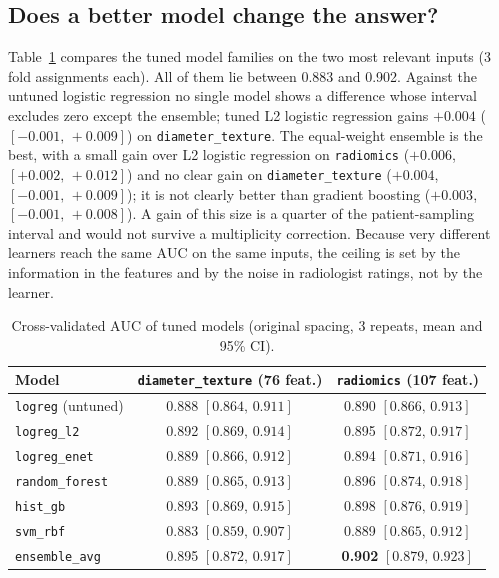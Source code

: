 \documentclass[journal]{IEEEtran}
\newcommand{\auc}{\mathrm{AUC}}
\newcommand{\ci}[2]{[#1,\,#2]}            %
\newcommand{\code}[1]{\texttt{#1}}
\begin{document}
\subsection{Does a better model change the answer?}
\label{sec:models}
Table~\ref{tab:models} compares the tuned model families on the two most relevant inputs (3 fold assignments each).
All of them lie between 0.883 and 0.902. Against the untuned logistic regression no single model
shows a difference whose interval excludes zero except the ensemble; tuned L2 logistic regression gains
$+0.004$ ($\ci{-0.001}{+0.009}$) on \code{diameter\_texture}. The equal-weight ensemble is the best, with a small
gain over L2 logistic regression on \code{radiomics} ($+0.006$, $\ci{+0.002}{+0.012}$) and no clear gain on
\code{diameter\_texture} ($+0.004$, $\ci{-0.001}{+0.009}$); it is not clearly better than gradient boosting
($+0.003$, $\ci{-0.001}{+0.008}$). A gain of this size is a quarter of the patient-sampling interval and would not
survive a multiplicity correction. Because very different learners reach the same $\auc$ on the same inputs, the
ceiling is set by the information in the features and by the noise in radiologist ratings, not by the learner.

\begin{table}[!t]
\caption{Cross-validated $\auc$ of tuned models (original spacing, 3 repeats, mean and 95\% CI).}
\label{tab:models}
\centering\small
\begin{tabular}{lcc}
\toprule
Model & \code{diameter\_texture} (76 feat.) & \code{radiomics} (107 feat.)\\
\midrule
\code{logreg} (untuned)  & 0.888 $\ci{0.864}{0.911}$ & 0.890 $\ci{0.866}{0.913}$\\
\code{logreg\_l2}        & 0.892 $\ci{0.869}{0.914}$ & 0.895 $\ci{0.872}{0.917}$\\
\code{logreg\_enet}      & 0.889 $\ci{0.866}{0.912}$ & 0.894 $\ci{0.871}{0.916}$\\
\code{random\_forest}    & 0.889 $\ci{0.865}{0.913}$ & 0.896 $\ci{0.874}{0.918}$\\
\code{hist\_gb}          & 0.893 $\ci{0.869}{0.915}$ & 0.898 $\ci{0.876}{0.919}$\\
\code{svm\_rbf}          & 0.883 $\ci{0.859}{0.907}$ & 0.889 $\ci{0.865}{0.912}$\\
\code{ensemble\_avg}     & 0.895 $\ci{0.872}{0.917}$ & \textbf{0.902} $\ci{0.879}{0.923}$\\
\bottomrule
\end{tabular}
\end{table}
\end{document}
